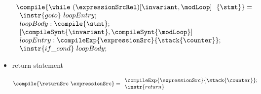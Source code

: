 \begin{itemize}
 $$\begin{array}{l} \compile{\while \ (\expressionSrcRel) \lbrack \invariant, \modLoop \rbrack \ \do \ \{ \stmt \} } = \\
         \begin{array}{l}
             \instr{goto} \ loopEntry; \\
	     loopBody: \compile{\stmt}; \\
	      \lbrack  \compileSynt{\invariant} , \compileSynt{\modLoop} \rbrack \\ 
	     loopEntry: \compileExp{\expressionSrc}{\stack{\counter}};\\
	               \instr{if\_cond} \ loopBody; \\
	      
	 \end{array}
    \end{array}
$$



 \item return statement

 $$ \compile{\returnSrc  \  \expressionSrc } =  
\begin{array}{l} 
\compileExp{ \expressionSrc }{ \stack{\counter}};\\
\instr{return}
\end{array}   $$
\end{itemize}

                       
%		
%

